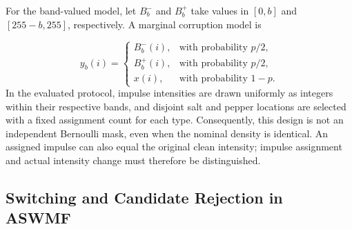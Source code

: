 \documentclass[pdflatex,iicol,sn-mathphys-num]{sn-jnl}
\newif\ifshowportuguese
\newcommand{\pt}[1]{\ifshowportuguese\par\begingroup\small\color{blue!55!black}\noindent\textbf{PT: }#1\par\endgroup\fi}
\begin{document}
For the band-valued model, let $B_b^{-}$ and $B_b^{+}$ take values in $[0,b]$ and $[255-b,255]$, respectively. A marginal corruption model is
\pt{Para o modelo de valores em faixas, sejam $B_b^{-}$ e $B_b^{+}$ variáveis com valores em $[0,b]$ e $[255-b,255]$, respectivamente. Um modelo marginal de corrupção é}
\begin{equation}
y_b(i)=\begin{cases}
B_b^{-}(i), & \text{with probability }p/2,\\
B_b^{+}(i), & \text{with probability }p/2,\\
x(i), & \text{with probability }1-p.
\end{cases}
\label{eq:band_noise_model}
\end{equation}
In the evaluated protocol, impulse intensities are drawn uniformly as integers within their respective bands, and disjoint salt and pepper locations are selected with a fixed assignment count for each type. Consequently, this design is not an independent Bernoulli mask, even when the nominal density is identical. An assigned impulse can also equal the original clean intensity; impulse assignment and actual intensity change must therefore be distinguished.
\pt{No protocolo avaliado, as intensidades impulsivas são sorteadas uniformemente como inteiros dentro das respectivas faixas, e as posições de sal e pimenta são disjuntas, com quantidade fixa de atribuições para cada tipo. Consequentemente, esse desenho não constitui uma máscara Bernoulli independente, mesmo quando a densidade nominal é idêntica. Um impulso atribuído também pode coincidir com a intensidade limpa original; portanto, é necessário distinguir a atribuição do impulso da alteração efetiva da intensidade.}


\subsection{Switching and Candidate Rejection in ASWMF}
\label{subsec:aswmf_principles}
\end{document}
